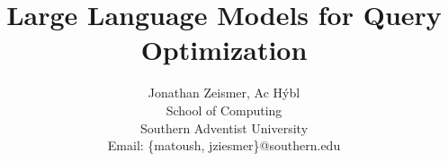 \title{Large Language Models for Query Optimization}
\author{Jonathan Zeismer, Ac Hýbl\\School of Computing\\Southern Adventist University\\Email: \{matoush, jziesmer\}@southern.edu}

\maketitle